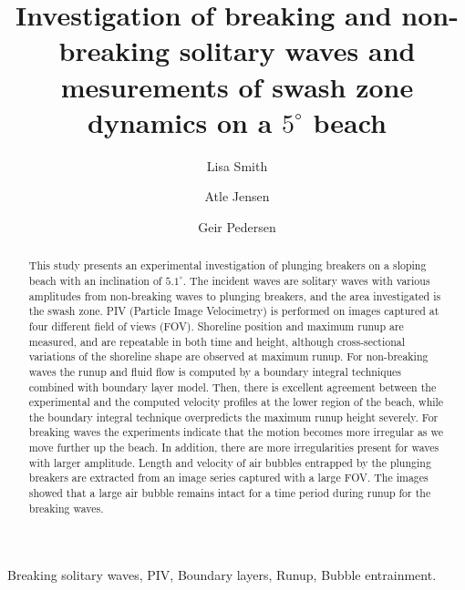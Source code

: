 \documentclass[review, authoryear]{elsarticle}
\begin{document}
\begin{frontmatter}
\title{Investigation of breaking and non-breaking solitary waves and mesurements of swash zone dynamics on 
a $5^\circ$ beach}
\author[1]{Lisa Smith}	
\author[1]{Atle Jensen}
\author[1]{Geir Pedersen}

\address[1]{ Department of Mathematics, University of Oslo, Norway}



\setlength{\marginparwidth}{1.1cm}

\begin{abstract}
This study presents an experimental investigation of plunging breakers on a sloping beach with an inclination of $5.1^{\circ}$. The incident waves are solitary waves with various amplitudes from non-breaking waves to plunging breakers, and the area investigated is the swash zone. PIV (Particle Image Velocimetry) is performed on images captured at four different field of views (FOV). Shoreline position and maximum runup are measured, and are repeatable in both time and height, although cross-sectional variations of the shoreline shape are observed at maximum runup. For non-breaking waves the runup and fluid flow is computed by
a boundary integral techniques
combined with boundary layer model.
Then, there is excellent agreement between the experimental and the computed 
velocity profiles at the lower region of the beach, while the boundary integral technique overpredicts the maximum runup height severely. 
For breaking waves the experiments indicate that the motion becomes more irregular as we move further up the beach. In addition, there are more irregularities present  for waves with larger amplitude. Length and velocity of air bubbles entrapped by the plunging breakers are extracted from an image series captured with a large FOV. The images showed that a large air bubble remains intact for a time period during runup for the breaking waves. \\

\end{abstract}


\begin{keyword}
Breaking solitary waves, PIV, Boundary layers, Runup, Bubble entrainment.
\end{keyword}

\end{frontmatter}

\linenumbers
\end{document}
